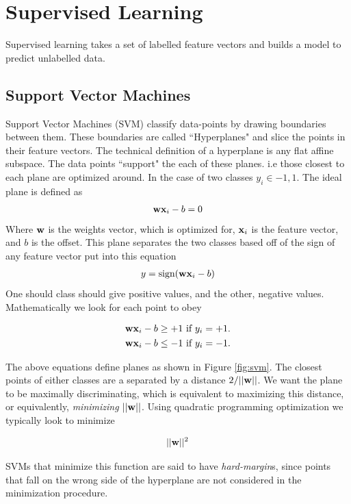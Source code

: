 \section{Supervised Learning}
Supervised learning takes a set of labelled feature vectors and builds a model to predict unlabelled data. 



\subsection{Support Vector Machines}\label{sub:svm}
Support Vector Machines (SVM) classify data-points by drawing boundaries between them. These boundaries are called ``Hyperplanes" and slice the points in their feature vectors. The technical definition of a hyperplane is any flat affine subspace. The data points “support" the each of these planes. i.e those closest to each plane are optimized around. In the case of two classes $y_i \in {-1,1}$. The ideal plane is defined as
\begin{align}
		\textbf{wx}_i-b =0
\end{align}
Where $\textbf{w}$ is the weights vector, which is optimized for, $\textbf{x}_i$ is the feature vector, and $b$ is the offset. This plane separates the two classes based off of the sign of any feature vector put into this equation
\begin{align}
	y = \textrm{sign}(\textbf{wx}_i-b)
\end{align}
One should class should give positive values, and the other, negative values. Mathematically we look for each point to obey

\begin{align}
	\textbf{wx}_i-b &\ge +1 ~\textrm{if}~ y_i = +1.  \label{svm_planes_pos}\\
	\textbf{wx}_i-b &\le -1 ~\textrm{if}~ y_i = -1.  \label{svm_planes_neg}
\end{align}

The above equations define planes as shown in Figure \ref{fig:svm}. The closest points of either classes are a separated by a distance $2/ ||\textbf{w}||$. We want the plane to be maximally discriminating, which is equivalent to maximizing this distance, or equivalently, \emph{minimizing} $||\textbf{w}||$. Using quadratic programming optimization we typically look to minimize \cite{burkov}


\begin{align}\label{svm_loss}
||\textbf{w}||^2
\end{align}

SVMs that minimize this function are said to have \emph{hard-margin}s, since points that fall on the wrong side of the hyperplane are not considered in the minimization procedure. 

